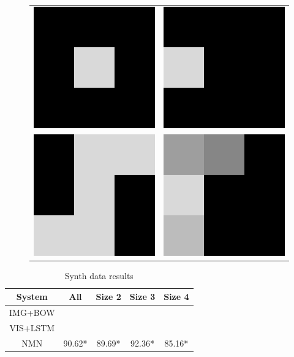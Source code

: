 \documentclass[10pt,twocolumn,letterpaper]{article}
\begin{document}
\begin{figure}
  \centering
  \begin{tabular}{cc}
    \includegraphics[width=0.25\columnwidth]{fig/shapes_in1} &
    \includegraphics[width=0.25\columnwidth]{fig/shapes_out1} \\
    \includegraphics[width=0.25\columnwidth]{fig/shapes_in2} &
    \includegraphics[width=0.25\columnwidth]{fig/shapes_out2} \\
  \end{tabular}
\end{figure}

\begin{table}
  \footnotesize
  \centering
  \begin{tabular}{ccccc}
    \toprule
    System & All & Size 2 & Size 3 & Size 4 \\
    \midrule
    IMG+BOW & \\
    VIS+LSTM &  \\
    NMN & 90.62* & 89.69* & 92.36* & 85.16* \\
    \bottomrule
  \end{tabular}
  \caption{Synth data results}
\end{table}
\end{document}

